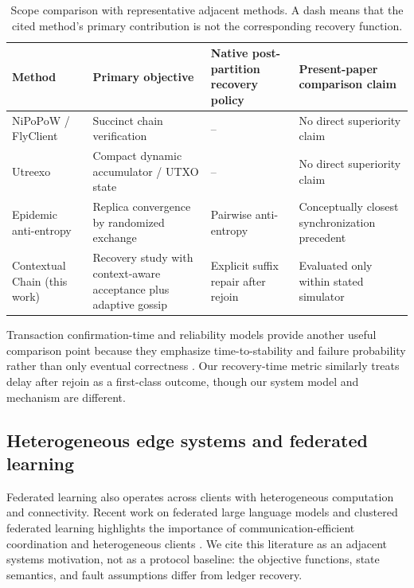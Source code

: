 \documentclass[11pt]{article}
\begin{document}
\begin{table}[H]
\centering
\caption{Scope comparison with representative adjacent methods. A dash means that the cited method's primary contribution is not the corresponding recovery function.}
\label{tab:scope-comparison}
\small
\begin{tabular}{>{\raggedright\arraybackslash}p{2.5cm}>{\raggedright\arraybackslash}p{3.1cm}>{\raggedright\arraybackslash}p{2.8cm}>{\raggedright\arraybackslash}p{2.8cm}}
\toprule
Method & Primary objective & Native post-partition recovery policy & Present-paper comparison claim\\
\midrule
NiPoPoW / FlyClient & Succinct chain verification & -- & No direct superiority claim\\
Utreexo & Compact dynamic accumulator / UTXO state & -- & No direct superiority claim\\
Epidemic anti-entropy & Replica convergence by randomized exchange & Pairwise anti-entropy & Conceptually closest synchronization precedent\\
Contextual Chain (this work) & Recovery study with context-aware acceptance plus adaptive gossip & Explicit suffix repair after rejoin & Evaluated only within stated simulator\\
\bottomrule
\end{tabular}
\end{table}

Transaction confirmation-time and reliability models provide another useful comparison point because they emphasize time-to-stability and failure probability rather than only eventual correctness \cite{Malakhov2023Confirmation,Malakhov2024Reliability}. Our recovery-time metric similarly treats delay after rejoin as a first-class outcome, though our system model and mechanism are different.

\subsection{Heterogeneous edge systems and federated learning}
Federated learning also operates across clients with heterogeneous computation and connectivity. Recent work on federated large language models and clustered federated learning highlights the importance of communication-efficient coordination and heterogeneous clients \cite{Cheng2025FedLLM,Cheng2025SnapCFL}. We cite this literature as an adjacent systems motivation, not as a protocol baseline: the objective functions, state semantics, and fault assumptions differ from ledger recovery.
\end{document}
